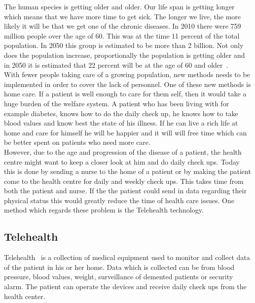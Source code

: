 	The human species is getting older and older. Our life span is getting longer which means that we have more time to get sick. The longer we live, the more likely it will be that we get one of the chronic diseases. In 2010 there were 759 million people over the age of 60. This was at the time 11 percent of the total population. In 2050 this group is estimated to be more than 2 billion. Not only does the population increase, proportionally the population is getting older and in 2050 it is estimated that 22 percent will be at the age of 60 and older~\cite{UNpub}.\\
	With fewer people taking care of a growing population, new methods needs to be implemented in order to cover the lack of personnel. One of these new methods is home care. If a patient is well enough to care for them self, then it would take a huge burden of the welfare system. A patient who has been living with for example diabetes, knows how to do the daily check up, he knows how to take blood values and know best the state of his illness. If he can live a rich life at home and care for himself he will be happier and it will will free time which can be better spent on patients who need more care.\\
	However, due to the age and progression of the disease of a patient, the health centre might want to keep a closer look at him and do daily check ups. Today this is done by sending a nurse to the home of a patient or by making the patient come to the health centre for daily and weekly check ups. This takes time from both the patient and nurse. If the the patient could send in data regarding their physical status this would greatly reduce the time of health care issues. One method which regards these problem is the Telehealth technology.\\

\subsection{Telehealth}
\label{sub:telehealth}
	Telehealth~\cite{telehealth} is a collection of medical equipment used to monitor and collect data of the patient in his or her home. Data which is collected can be from blood pressure, blood values, weight, surveillance of demented patients or security alarm. The patient can operate the devices and receive daily check ups from the health center.\\

